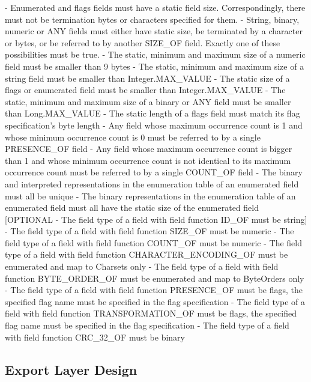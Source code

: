 - Enumerated and flags fields must have a static field size. Correspondingly, there must not be termination bytes or characters specified for them.
- String, binary, numeric or ANY fields must either have static size, be terminated by a character or bytes, or be referred to by another SIZE\_OF field. Exactly one of these possibilities must be true.
- The static, minimum and maximum size of a numeric field must be smaller than 9 bytes
- The static, minimum and maximum size of a string field must be smaller than Integer.MAX\_VALUE
- The static size of a flags or enumerated field must be smaller than Integer.MAX\_VALUE
- The static, minimum and maximum size of a binary or ANY field must be smaller than Long.MAX\_VALUE
- The static length of a flags field must match its flag specification's byte length
- Any field whose maximum occurrence count is 1 and whose minimum occurrence count is 0 must be referred to by a single PRESENCE\_OF field
- Any field whose maximum occurrence count is bigger than 1 and whose minimum occurrence count is not identical to its maximum occurrence count must be referred to by a single COUNT\_OF field
- The binary and interpreted representations in the enumeration table of an enumerated field must all be unique
- The binary representations in the enumeration table of an enumerated field must all have the static size of the enumerated field
[OPTIONAL - The field type of a field with field function ID\_OF must be string]
- The field type of a field with field function SIZE\_OF must be numeric
- The field type of a field with field function COUNT\_OF must be numeric
- The field type of a field with field function CHARACTER\_ENCODING\_OF must be enumerated and map to Charsets only
- The field type of a field with field function BYTE\_ORDER\_OF must be enumerated and map to ByteOrders only
- The field type of a field with field function PRESENCE\_OF must be flags, the specified flag name must be specified in the flag specification
- The field type of a field with field function TRANSFORMATION\_OF must be flags, the specified flag name must be specified in the flag specification
- The field type of a field with field function CRC\_32\_OF must be binary


\subsection{Export Layer Design}
\label{sec:ExportDesignCOMPdataFormatManagement}


